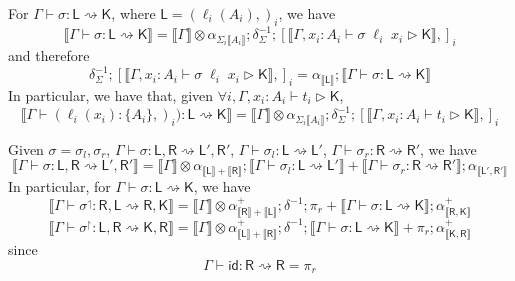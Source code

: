 \documentclass[acmsmall,screen,review]{acmart}
\newcommand{\ms}[1]{\ensuremath{\mathsf{#1}}}
\newcommand{\lto}{:}
\newcommand{\wbranch}[3]{#1(#2) \lto \{#3\}}
\newcommand{\rupg}[1]{{#1}^\upharpoonright}
\newcommand{\lupg}[1]{{#1}^\upharpoonleft}
\newcommand{\bhyp}[2]{#1 : #2}
\newcommand{\haslb}[3]{#1 \vdash #2 \rhd #3}
\newcommand{\lbsubst}[4]{#1 \vdash #2: #3 \rightsquigarrow #4}
\newcommand{\dnt}[1]{\llbracket{#1}\rrbracket}
\begin{document}
\begin{lemma}
  For $\lbsubst{\Gamma}{\sigma}{\ms{L}}{\ms{K}}$, where $\ms{L} = (\ell_i(A_i),)_i$, we have
  \begin{equation}
    \dnt{\lbsubst{\Gamma}{\sigma}{\ms{L}}{\ms{K}}} 
    = \dnt{\Gamma} \otimes \alpha_{\Sigma_i\dnt{A_i}} 
    ; \delta^{-1}_{\Sigma}
    ; [\dnt{\haslb{\Gamma, \bhyp{x_i}{A_i}}{\sigma\;\ell_i\;x_i}{\ms{K}}},]_i
  \end{equation}
  and therefore
  \begin{equation}
    \delta^{-1}_{\Sigma}
    ; [\dnt{\haslb{\Gamma, \bhyp{x_i}{A_i}}{\sigma\;\ell_i\;x_i}{\ms{K}}},]_i
    = \alpha_{\dnt{\ms{L}}}
    ; \dnt{\lbsubst{\Gamma}{\sigma}{\ms{L}}{\ms{K}}} 
  \end{equation}
  In particular, we have that, given $\forall i, \haslb{\Gamma, \bhyp{x_i}{A_i}}{t_i}{\ms{K}}$,
  \begin{equation}
    \dnt{\lbsubst{\Gamma}{(\wbranch{\ell_i}{x_i}{A_i},)_i)}{\ms{L}}{\ms{K}}}
    = \dnt{\Gamma} \otimes \alpha_{\Sigma_i\dnt{A_i}} 
    ; \delta^{-1}_{\Sigma}
    ; [\dnt{\haslb{\Gamma, \bhyp{x_i}{A_i}}{t_i}{\ms{K}}},]_i
  \end{equation}
  \label{lem:lsubst-distrib}
\end{lemma}

\begin{lemma}
  Given $\sigma = \sigma_l, \sigma_r$,
    $\lbsubst{\Gamma}{\sigma}{\ms{L}, \ms{R}}{\ms{L}', \ms{R}'}$,
    $\lbsubst{\Gamma}{\sigma_l}{\ms{L}}{\ms{L}'}$,
    $\lbsubst{\Gamma}{\sigma_r}{\ms{R}}{\ms{R}'}$, we have
  \begin{equation}
    \dnt{\lbsubst{\Gamma}{\sigma}{\ms{L}, \ms{R}}{\ms{L}', \ms{R}'}}
    = \dnt{\Gamma} \otimes \alpha_{\dnt{\ms{L}} + \dnt{\ms{R}}} 
    ; \dnt{\lbsubst{\Gamma}{\sigma_l}{\ms{L}}{\ms{L}'}} 
    + \dnt{\lbsubst{\Gamma}{\sigma_r}{\ms{R}}{\ms{R}'}}
    ; \alpha_{\dnt{\ms{L}', \ms{R}'}}
  \end{equation}
  In particular, for $\lbsubst{\Gamma}{\sigma}{\ms{L}}{\ms{K}}$, we have
  \begin{equation}
    \dnt{\lbsubst{\Gamma}{\lupg{\sigma}}{\ms{R}, \ms{L}}{\ms{R}, \ms{K}}}
    = \dnt{\Gamma} \otimes \alpha^+_{\dnt{\ms{R}} + \dnt{\ms{L}}} 
      ; \delta^{-1} 
      ; \pi_r + \dnt{\lbsubst{\Gamma}{\sigma}{\ms{L}}{\ms{K}}}
      ; \alpha^+_{\dnt{\ms{R}, \ms{K}}}
  \end{equation}
  \begin{equation}
    \dnt{\lbsubst{\Gamma}{\rupg{\sigma}}{\ms{L}, \ms{R}}{\ms{K}, \ms{R}}}
    = \dnt{\Gamma} \otimes \alpha^+_{\dnt{\ms{L}} + \dnt{\ms{R}}} 
      ; \delta^{-1} 
      ; \dnt{\lbsubst{\Gamma}{\sigma}{\ms{L}}{\ms{K}}} + \pi_r
      ; \alpha^+_{\dnt{\ms{K}, \ms{R}}}
  \end{equation}
  since
  \begin{equation}
    \lbsubst{\Gamma}{\ms{id}}{\ms{R}}{\ms{R}} = \pi_r
  \end{equation}
\end{lemma}
\end{document}
